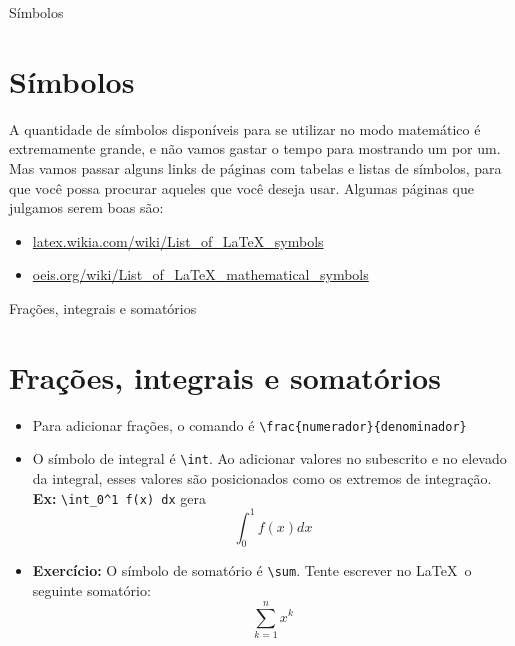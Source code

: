 \documentclass[12pt]{beamer}
\begin{document}
\begin{frame}{Símbolos}
  \section{Símbolos}

  A quantidade de símbolos disponíveis para se utilizar no modo matemático é extremamente grande, e não vamos gastar o tempo para mostrando um por um. Mas vamos passar alguns links de páginas com tabelas e listas de símbolos, para que você possa procurar aqueles que você deseja usar. Algumas páginas que julgamos serem boas são:

  \begin{itemize}
    \item \url{latex.wikia.com/wiki/List_of_LaTeX_symbols}
    \item \url{oeis.org/wiki/List_of_LaTeX_mathematical_symbols}
  \end{itemize}
\end{frame}

\begin{frame}[fragile]{Frações, integrais e somatórios}
  \section{Frações, integrais e somatórios}
  \begin{itemize}
    \item Para adicionar frações, o comando é \verb+\frac{numerador}{denominador}+
    \item O símbolo de integral é \verb+\int+. Ao adicionar valores no subescrito e no elevado da integral, esses valores são posicionados como os extremos de integração. \textbf{Ex:} \verb+\int_0^1 f(x) dx+ gera
    \[
    \int_{0}^1 f(x) dx
    \]
    \item \textbf{Exercício:} O símbolo de somatório é \verb+\sum+. Tente escrever no \LaTeX\ o seguinte somatório:
    \[
      \sum_{k=1}^n x^k
    \]
  \end{itemize}
\end{frame}
\end{document}
